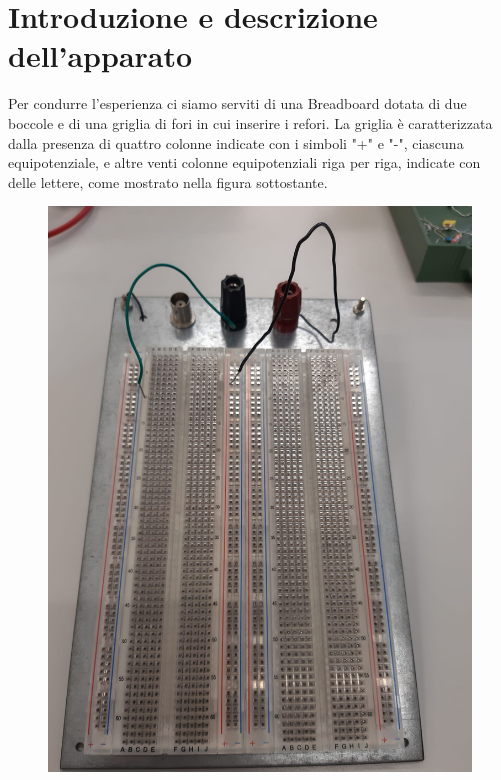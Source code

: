 \section{Introduzione e descrizione dell'apparato}
Per condurre l'esperienza ci siamo serviti di una Breadboard dotata di due boccole e di una griglia di fori in cui inserire i refori. La griglia è caratterizzata dalla presenza di quattro colonne indicate con i simboli "+" e "-", ciascuna equipotenziale, e altre venti colonne equipotenziali riga per riga, indicate con delle lettere, come mostrato nella figura sottostante.

\begin{figure}[h!]
    \centering
    \includegraphics[scale=0.1]{Immagini/Circuitoooo.jpeg}
    \caption{}
\end{figure}

